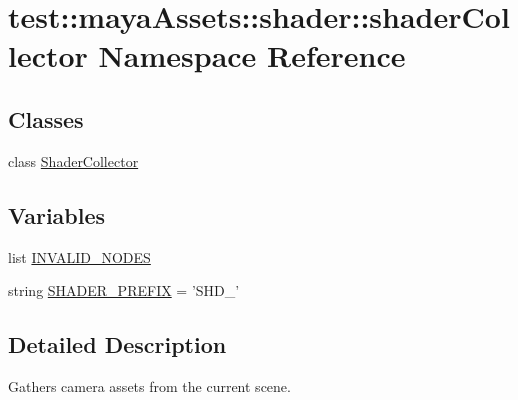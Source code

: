 \hypertarget{namespacetest_1_1mayaAssets_1_1shader_1_1shaderCollector}{\section{test\-:\-:maya\-Assets\-:\-:shader\-:\-:shader\-Collector \-Namespace \-Reference}
\label{db/de4/namespacetest_1_1mayaAssets_1_1shader_1_1shaderCollector}
}
\subsection*{\-Classes}
\begin{DoxyCompactItemize}
\item 
class \hyperlink{classtest_1_1mayaAssets_1_1shader_1_1shaderCollector_1_1ShaderCollector}{\-Shader\-Collector}
\end{DoxyCompactItemize}
\subsection*{\-Variables}
\begin{DoxyCompactItemize}
\item 
list \hyperlink{namespacetest_1_1mayaAssets_1_1shader_1_1shaderCollector_a9f738a3e2a710b17ec46d6a0351fdc4e}{\-I\-N\-V\-A\-L\-I\-D\-\_\-\-N\-O\-D\-E\-S}
\item 
string \hyperlink{namespacetest_1_1mayaAssets_1_1shader_1_1shaderCollector_a551a9daab0822b196b7d89edadbfdc5b}{\-S\-H\-A\-D\-E\-R\-\_\-\-P\-R\-E\-F\-I\-X} = '\-S\-H\-D\-\_\-'
\end{DoxyCompactItemize}


\subsection{\-Detailed \-Description}
\begin{DoxyVerb}
Gathers camera assets from the current scene.
\end{DoxyVerb}
 

